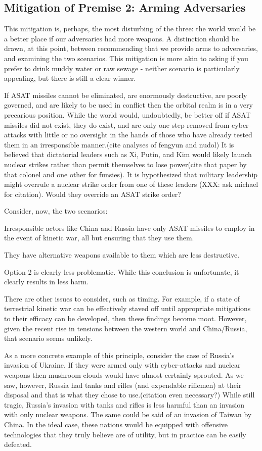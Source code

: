 \subsection{Mitigation of Premise 2: Arming Adversaries}
This mitigation is, perhaps, the most disturbing of the three: the world would be a better place if our adversaries had more weapons.  A distinction should be drawn, at this point, between recommending that we provide arms to adversaries, and examining the two scenarios.  This mitigation is more akin to asking if you prefer to drink muddy water or raw sewage - neither scenario is particularly appealing, but there is still a clear winner.

If ASAT missiles cannot be eliminated, are enormously destructive, are poorly governed, and are likely to be used in conflict then the orbital realm is in a very precarious position.  While the world would, undoubtedly, be better off if ASAT missiles did not exist, they do exist, and are only one step removed from cyber-attacks with little or no oversight in the hands of those who have already tested them in an irresponsible manner.(cite analyses of fengyun and nudol)  It is believed that dictatorial leaders such as Xi, Putin, and Kim would likely launch nuclear strikes rather than permit themselves to lose power(cite that paper by that colonel and one other for funsies).  It is hypothesized that military leadership might overrule a nuclear strike order from one of these leaders (XXX: ask michael for citation).  Would they override an ASAT strike order?

Consider, now, the two scenarios:

Irresponsible actors like China and Russia have only ASAT missiles to employ in the event of kinetic war, all but ensuring that they use them.

They have alternative weapons available to them which are less destructive.

Option 2 is clearly less problematic.  While this conclusion is unfortunate, it clearly results in less harm.

There are other issues to consider, such as timing.  For example, if a state of terrestrial kinetic war can be effectively staved off until appropriate mitigations to their efficacy can be developed, then these findings become moot.  However, given the recent rise in tensions between the western world and China/Russia, that scenario seems unlikely.

As a more concrete example of this principle, consider the case of Russia's invasion of Ukraine.  If they were armed only with cyber-attacks and nuclear weapons then mushroom clouds would have almost certainly sprouted.  As we saw, however, Russia had tanks and rifles (and expendable riflemen) at their disposal and that is what they chose to use.(citation even necessary?)  While still tragic, Russia's invasion with tanks and rifles is less harmful than an invasion with only nuclear weapons.  The same could be said of an invasion of Taiwan by China.  In the ideal case, these nations would be equipped with offensive technologies that they truly believe are of utility, but in practice can be easily defeated.

